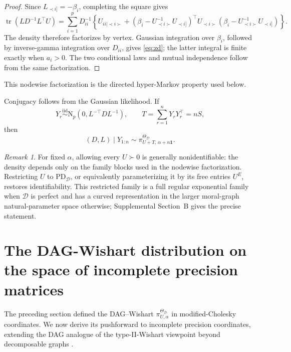 \documentclass[12pt]{article}
\DeclareMathOperator{\tr}{tr}
\newcommand{\D}{\mathcal{D}}
\theoremstyle{plain}
\theoremstyle{definition}
\theoremstyle{remark}
\newtheorem{Rem}[theorem]{Remark}
\begin{document}
\begin{proof}
Since \(L_{\prec i]}=-\beta_i\), completing the square gives
\[
\tr(LD^{-1}L^\top U)
=\sum_{i=1}^pD_{ii}^{-1}
\left\{U_{ii\mid\prec i\succ}
+(\beta_i-U_{\prec i\succ}^{-1}U_{\prec i]})^\top
U_{\prec i\succ}
(\beta_i-U_{\prec i\succ}^{-1}U_{\prec i]})\right\}.
\]
The density therefore factorizes by vertex.  Gaussian integration over
\(\beta_i\), followed by inverse-gamma integration over \(D_{ii}\),
gives \eqref{eq:zd}; the latter integral is finite exactly when
\(a_i>0\).  The two conditional laws and mutual independence follow
from the same factorization.
\end{proof}

This nodewise factorization is the directed hyper-Markov property used
below.

Conjugacy follows from the Gaussian likelihood.  If
\[
Y_r\stackrel{\mathrm{iid}}{\sim}
\mathrm{N}_p(0,L^{-\top}DL^{-1}),\qquad
T=\sum_{r=1}^nY_rY_r^\top=nS,
\]
then
\[
(D,L)\mid Y_{1:n}\sim
\pi_{U+T,\,\alpha+n\mathbf{1}}^{\Theta_{\D}}.
\]

\begin{Rem}\label{rem:identefibility}
For fixed \(\alpha\), allowing every \(U\succ0\) is generally
nonidentifiable: the density depends only on the family blocks used in
the nodewise factorization.  Restricting \(U\) to \(\mathrm{PD}_{\D}\),
or equivalently parameterizing it by its free entries \(U^E\), restores
identifiability.  This restricted family is a full regular exponential
family when \(\D\) is perfect and has a curved representation in the
larger moral-graph natural-parameter space otherwise; Supplemental
Section~B gives the precise statement.
\end{Rem}
 \section{The DAG-Wishart distribution on the space of incomplete precision matrices} \label{sec:wishart_incomplete}
The preceding section defined the DAG--Wishart
$\pi^{\Theta_{\D}}_{U,\alpha}$ in modified-Cholesky coordinates.  We now
derive its pushforward to incomplete precision coordinates, extending the
DAG analogue of the type-II-Wishart viewpoint beyond decomposable graphs
\cite{letac07*}.
 
\end{document}
